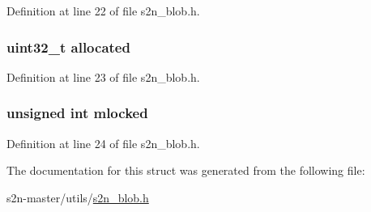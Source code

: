 Definition at line 22 of file s2n\+\_\+blob.\+h.

\subsubsection[{\texorpdfstring{allocated}{allocated}}]{\setlength{\rightskip}{0pt plus 5cm}uint32\+\_\+t allocated}\hypertarget{structs2n__blob_a9ffa331535fe886bb8208ccee04393db}{}\label{structs2n__blob_a9ffa331535fe886bb8208ccee04393db}


Definition at line 23 of file s2n\+\_\+blob.\+h.

\subsubsection[{\texorpdfstring{mlocked}{mlocked}}]{\setlength{\rightskip}{0pt plus 5cm}unsigned int mlocked}\hypertarget{structs2n__blob_aadc4831179870523e92ff16734a830ea}{}\label{structs2n__blob_aadc4831179870523e92ff16734a830ea}


Definition at line 24 of file s2n\+\_\+blob.\+h.



The documentation for this struct was generated from the following file\+:\begin{DoxyCompactItemize}
\item 
s2n-\/master/utils/\hyperlink{s2n__blob_8h}{s2n\+\_\+blob.\+h}\end{DoxyCompactItemize}
